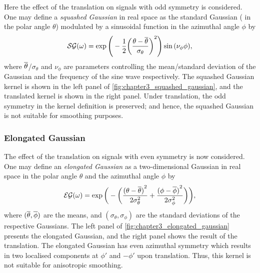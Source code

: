 Here the effect of the translation on signals with odd symmetry is considered.
One may define a \emph{squashed Gaussian} in real space as the standard Gaussian (\ie{} in the polar angle \(\theta{}\)) modulated by a sinusoidal function in the azimuthal angle \(\phi{}\) by
%
\begin{equation}\label{eq:chapter3_squashed_gaussian}
    \mathcal{SG}(\omega)
    = \exp\Bigg(-\frac{1}{2}{\bigg(\frac{\theta-\overline{\theta}}{\sigma_{\theta}}\bigg)}^{2}\Bigg)
    \sin{(\nu_{\phi}\phi)},
\end{equation}
%
where \(\overline{\theta}\)/\(\sigma_{\theta}\) and \(\nu_{\phi}\) are parameters controlling the mean/standard deviation of the Gaussian and the frequency of the sine wave respectively.
The squashed Gaussian kernel is shown in the left panel of \cref{fig:chapter3_squashed_gaussian}, and the translated kernel is shown in the right panel.
Under translation, the odd symmetry in the kernel definition is preserved; and hence, the squashed Gaussian is not suitable for smoothing purposes.



\subsubsection{Elongated Gaussian}

The effect of the translation on signals with even symmetry is now considered.
One may define an \emph{elongated Gaussian} as a two-dimensional Gaussian in real space in the polar angle \(\theta{}\) and the azimuthal angle \(\phi{}\) by
%
\begin{equation}\label{eq:chapter3_elongated_gaussian}
    \mathcal{EG}(\omega)
    = \exp\bigg(-\bigg(\frac{{(\theta-\overline{\theta})}^{2}}{2\sigma_{\theta}^{2}}
        + \frac{{(\phi-\overline{\phi})}^{2}}{2\sigma_{\phi}^{2}}\bigg)\bigg),
\end{equation}
%
where \((\overline{\theta},\overline{\phi})\) are the means, and \((\sigma_{\theta},\sigma_{\phi})\) are the standard deviations of the respective Gaussians.
The left panel of \cref{fig:chapter3_elongated_gaussian} presents the elongated Gaussian, and the right panel shows the result of the translation.
The elongated Gaussian has even azimuthal symmetry which results in two localised components at \(\phi'\) and \(-\phi'\) upon translation.
Thus, this kernel is not suitable for anisotropic smoothing.



